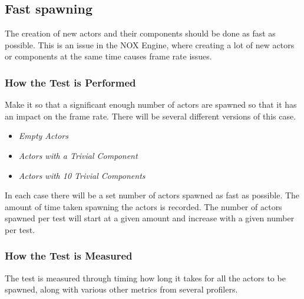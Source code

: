 \subsection{Fast spawning}
The creation of new actors and their components should be done as fast as possible.
This is an issue in the NOX Engine, where creating a lot of new actors or components at the same time causes frame rate issues.

\subsubsection*{How the Test is Performed}
Make it so that a significant enough number of actors are spawned so that it has an impact on the frame rate.
There will be several different versions of this case.

\begin{itemize}

    \item\noindent\textit{Empty Actors}\\

    \item\noindent\textit{Actors with a Trivial Component}\\

    \item\noindent\textit{Actors with 10 Trivial Components}\\

\end{itemize}
In each case there will be a set number of actors spawned as fast as possible.
The amount of time taken spawning the actors is recorded.
The number of actors spawned per test will start at a given amount and increase with a given number per test.

\subsubsection*{How the Test is Measured}
The test is measured through timing how long it takes for all the actors to be spawned, along with various other metrics from several profilers.
